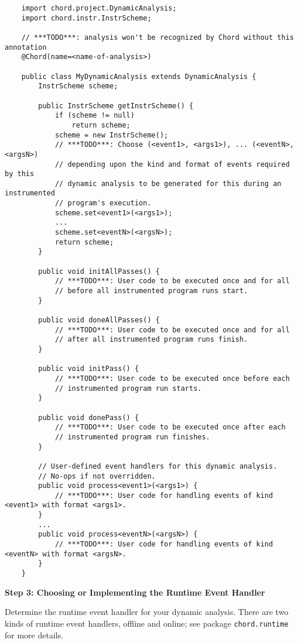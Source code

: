 \begin{verbatim}
    import chord.project.DynamicAnalysis;
    import chord.instr.InstrScheme;

    // ***TODO***: analysis won't be recognized by Chord without this annotation
    @Chord(name=<name-of-analysis>)    
    
    public class MyDynamicAnalysis extends DynamicAnalysis {
        InstrScheme scheme;

        public InstrScheme getInstrScheme() {
            if (scheme != null)
                return scheme;
            scheme = new InstrScheme();
            // ***TODO***: Choose (<event1>, <args1>), ... (<eventN>, <argsN>)
            // depending upon the kind and format of events required by this
            // dynamic analysis to be generated for this during an instrumented
            // program's execution.
            scheme.set<event1>(<args1>);
            ...
            scheme.set<eventN>(<argsN>);
            return scheme;
        }

        public void initAllPasses() {
            // ***TODO***: User code to be executed once and for all
            // before all instrumented program runs start.
        }

        public void doneAllPasses() {
            // ***TODO***: User code to be executed once and for all
            // after all instrumented program runs finish.
        }

        public void initPass() {
            // ***TODO***: User code to be executed once before each
            // instrumented program run starts.
        }

        public void donePass() {
            // ***TODO***: User code to be executed once after each
            // instrumented program run finishes.
        }

        // User-defined event handlers for this dynamic analysis.
        // No-ops if not overridden.
        public void process<event1>(<args1>) {
            // ***TODO***: User code for handling events of kind <event1> with format <args1>.
        }
        ...
        public void process<eventN>(<argsN>) {
            // ***TODO***: User code for handling events of kind <eventN> with format <argsN>.
        }
    }
\end{verbatim}

{\bf Step 3: Choosing or Implementing the Runtime Event Handler}

Determine the runtime event handler for your dynamic analysis. There are two kinds of runtime event
handlers, offline and online; see package \verb+chord.runtime+ for more details.

